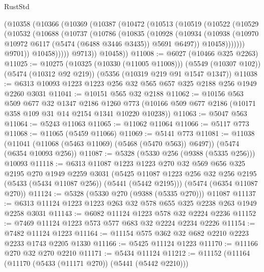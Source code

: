 \begin{lexlean}{RustStd}
\begin{coremodule}
        (@10358
          (@10366
            (@10369
              (@10387
                (@10472
                  (@10513
                    (@10519
                      (@10522
                        (@10529
                          (@10532
                            (@10688
                              (@10737
                                (@10786
                                  (@10835
                                    (@10928
                                      (@10934
                                        (@10938
                                          (@10970
                                            @10972
                                            @6117
                                            (@5474 (@6488 @3446 @3435))
                                            @5691
                                            @6497))
                                        @10458)))))))
                          @9701))
                      @10458)))))
            @9713))
        @10458))
@11008 := @6027 (@10466 @325 @2263)
@11025 := @10275
    (@10325 (@10330 (@11005 @11008)))
    (@5549 (@10307 @102))
    (@5474 (@10312 @92 @219))
    (@5356 (@10319 @219 @91 @1547 @1347))
@11038 := @6313 @10093 @1223 @1223 @256 @32 @565 @657 @325 @2188 @256 @1949 @2260 @3031
@11041 := @10151 @565 @32 @2188
@11062 := @10156
    @563
    @509
    @677
    @32
    @1347
    @2186
    @1260
    @773
    (@10166 @509 @677 @2186 (@10171 @358 @109 @31 @14 @2154 @1341 @10220 @10238))
@11063 := @5047 @563
@11064 := @5243 @11063
@11065 := @11062 @11064
@11066 := @5117 @773
@11068 := @11065 (@5459 @11066)
@11069 := @5141 @773
@11081 := @11038
    (@11041 (@11068 (@5463 @11069) (@5468 (@5470 @563)) @6497))
    (@5474 (@6354 @10093 @256))
@11087 := @5328 (@5330 @256 (@9388 (@5335 @256))) @10093
@11118 := @6313
    @11087
    @1223
    @1223
    @270
    @32
    @569
    @656
    @325
    @2195
    @270
    @1949
    @2259
    @3031
    (@5425 @11087 @1223 @256 @32 @256 @2195 (@5433 (@5434 @11087 @256)) (@5441 (@5442 @2195)))
    (@5474 (@6354 @11087 @270))
@11124 := @5328 (@5330 @270 (@9388 (@5335 @270))) @11087
@11137 := @6313 @11124 @1223 @1223 @263 @32 @578 @655 @325 @2238 @263 @1949 @2258 @3031
@11143 := @6082 @11124 @1223 @578 @32 @2224 @2236
@11152 := @7469 @11124 @1223 @573 @577 @683 @32 @2224 @2234 @2226
@11154 := @7482 @11124 @1223
@11164 := @11154 @575 @362 @32 @682 @2210 @2223 @2233 @1743 @2205 @1330
@11166 := @5425 @11124 @1223
@11170 := @11166 @270 @32 @270 @2210
@11171 := @5434 @11124
@11212 := @11152
    (@11164
      (@11170 (@5433 (@11171 @270)) (@5441 (@5442 @2210)))

\end{coremodule}
\end{lexlean}
